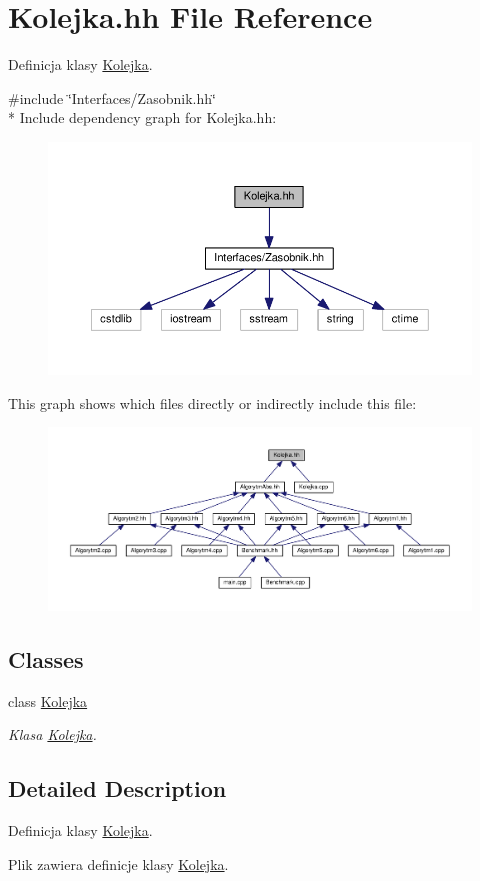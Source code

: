 \hypertarget{a00040}{}\section{Kolejka.\+hh File Reference}
\label{a00040}


Definicja klasy \hyperlink{a00011}{Kolejka}.  


{\ttfamily \#include \char`\"{}Interfaces/\+Zasobnik.\+hh\char`\"{}}\\*
Include dependency graph for Kolejka.\+hh\+:
\nopagebreak
\begin{figure}[H]
\begin{center}
\leavevmode
\includegraphics[width=350pt]{a00085}
\end{center}
\end{figure}
This graph shows which files directly or indirectly include this file\+:
\nopagebreak
\begin{figure}[H]
\begin{center}
\leavevmode
\includegraphics[width=350pt]{a00086}
\end{center}
\end{figure}
\subsection*{Classes}
\begin{DoxyCompactItemize}
\item 
class \hyperlink{a00011}{Kolejka}
\begin{DoxyCompactList}\small\item\em Klasa \hyperlink{a00011}{Kolejka}. \end{DoxyCompactList}\end{DoxyCompactItemize}


\subsection{Detailed Description}
Definicja klasy \hyperlink{a00011}{Kolejka}. 

Plik zawiera definicje klasy \hyperlink{a00011}{Kolejka}. 